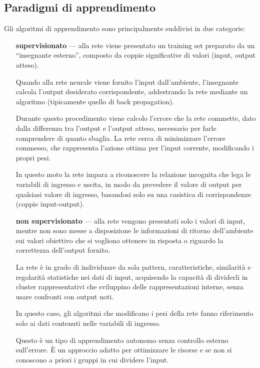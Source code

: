 \subsection{Paradigmi di apprendimento}
\label{subsec:Paradigmi di apprendimento}

Gli algoritmi di apprendimento sono principalmente suddivisi in due categorie:
\begin{itemize}
	\item[\bfseries supervisionato] --- alla rete viene presentato un training set preparato da un ``insegnante esterno'', composto da coppie significative di valori (input, output atteso).
	
	Quando alla rete neurale viene fornito l'input dall'ambiente, l'insegnante calcola l'output desiderato corrispondente, addestrando la rete mediante un algoritmo (tipicamente quello di back propagation). 
	
	{\color{red}Durante questo procedimento viene calcolo l'errore che la rete commette, } dato dalla differenza tra l'output e l'output atteso, necessario per farle comprendere di quanto sbaglia. La rete cerca di minimizzare l'errore commesso, che rappresenta l'azione ottima per l'input corrente, modificando i propri pesi.
	
	In questo moto la rete impara a riconoscere la relazione incognita che lega le variabili di ingresso e uscita, in modo da prevedere il valore di output per qualsiasi valore di ingresso, basandosi solo su una casistica di corrispondenze (coppie input-output).
	
	\item[\bfseries non supervisionato] --- alla rete vengono presentati solo i valori di input, mentre non sono messe a disposizione le informazioni di ritorno dell'ambiente sui valori obiettivo che si vogliono ottenere in risposta o riguardo la correttezza dell'output fornito.
	
	La rete è in grado di individuare da sola pattern, caratteristiche, similarità e regolarità statistiche nei dati di input, acquisendo la capacità di dividerli in cluster rappresentativi che sviluppino delle rappresentazioni interne, senza usare confronti con output noti.
	
	In questo caso, gli algoritmi che modificano i pesi della rete fanno riferimento solo ai dati contenuti nelle variabili di ingresso.
	
	Questo è un tipo di apprendimento autonomo senza controllo esterno sull'errore. È un approccio adatto per ottimizzare le risorse e se non si conoscono a priori i gruppi in cui dividere l'input.
\end{itemize}

